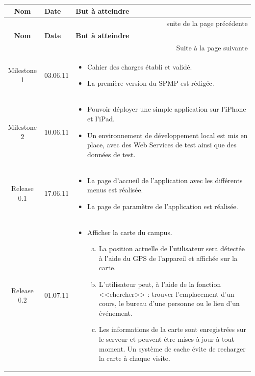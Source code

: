 \begin{longtable}{|c|l|p{10cm}|}
		 \hline  \textbf{Nom} & \textbf{Date}  & \textbf{But à atteindre}  \\ 
		 \endfirsthead
		  \multicolumn{3}{|r|}{{suite de la page précédente}} \\ \hline
		\hline  \textbf{Nom} & \textbf{Date}  & \textbf{But à atteindre}  \\ 
		 \endhead
		  \multicolumn{3}{|r|}{{Suite à la page suivante}} \\ \hline
		 \endfoot
		 \endlastfoot
		 \hline  Milestone 1 & 03.06.11  & 
		 	\begin{itemize}
		 	 		\item Cahier des charges établi et validé.
		 			\item La première version du \gls{SPMP} est rédigée.
		 	\end{itemize}   \\ 
		 \hline  Milestone 2 & 10.06.11  & 
		 	\begin{itemize}
		 	 		\item Pouvoir déployer une simple application sur l'iPhone et l'iPad.
		 			\item Un environnement de développement local est mis en place, avec des Web Services de test ainsi que des données de test.
		 	\end{itemize}   \\ 
	 	 \hline  Release 0.1 & 17.06.11  & 
		 	\begin{itemize}
		 	 		\item La page d'accueil de l'application avec les différents menus est réalisée.
		 			\item La page de paramètre de l'application est réalisée.
		 	\end{itemize}   \\ 
	 	 \hline  Release 0.2 & 01.07.11  & 
		 	\begin{itemize}
		 	 		\item Afficher la carte du campus.
		 	 		\begin{enumerate}[a)]
	 	 				\item La position actuelle de l'utilisateur sera détectée à l'aide du \gls{GPS} de l'appareil et affichée sur la carte.
	 	 				\item L'utilisateur peut, à l'aide de la fonction <<chercher>> : trouver l'emplacement d'un cours, le bureau d'une personne ou le lieu d'un événement.
	 	 				\item Les informations de la carte sont enregistrées sur le serveur et peuvent être mises à jour à tout moment. Un système de cache évite de recharger la carte à chaque visite.

\end{enumerate}
\end{itemize}
\end{longtable}
